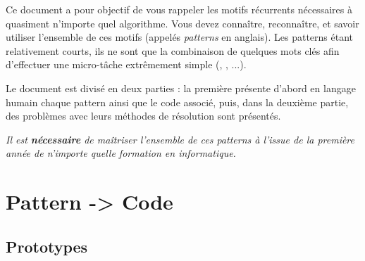 \documentclass[11pt,a4paper]{article}
\begin{document}
\EncadreTitre

\bigskip


%
%

\bigskip


Ce document a pour objectif de vous rappeler les motifs récurrents nécessaires à quasiment n'importe quel algorithme.
Vous devez connaître, reconnaître, et savoir utiliser l'ensemble de ces motifs (appelés \og \textit{patterns} \fg{} en anglais).
Les patterns étant relativement courts, ils ne sont que la combinaison de quelques mots clés afin d'effectuer une micro-tâche extrêmement simple (, , ...).

\bigskip

Le document est divisé en deux parties : la première présente d'abord en langage humain chaque pattern ainsi que le code associé, puis, dans la deuxième partie, des problèmes avec leurs méthodes de résolution sont présentés.

\medskip

\textit{Il est \textbf{nécessaire} de maîtriser l'ensemble de ces patterns à l'issue de la première année de n'importe quelle formation en informatique.}

\bigskip


\section{Pattern -> Code}

\subsection{Prototypes}
\end{document}
